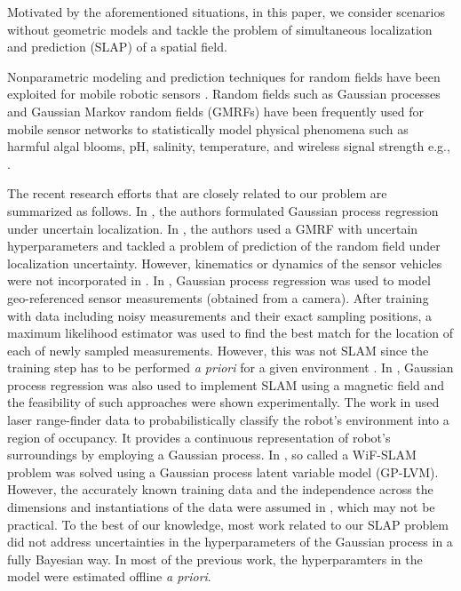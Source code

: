 \documentclass[letterpaper, 10 pt, conference]{ieeeconf}
\begin{document}
Motivated by the aforementioned situations, in this paper, we consider scenarios without geometric models and tackle the problem of simultaneous localization and prediction (SLAP) of a spatial field. %

%
%
% 
 
 
 Nonparametric modeling and prediction techniques for random fields have been exploited for mobile robotic sensors \cite{lynch:2008, leonard:2007,choi:2009,cortes:2009,Xu2011sequential}. Random fields such as Gaussian processes and Gaussian Markov random fields (GMRFs)  \cite{cressie:1986,rasmussen:2006} have been frequently used for mobile sensor networks to statistically model physical phenomena such as harmful algal blooms, pH, salinity, temperature, and wireless signal strength e.g., \cite{krause:2008,xu:2011b,graham:2009}.

 {
 The recent research efforts that are closely related to our problem are summarized as follows.
In \cite{jad2012gaussian}, the authors  formulated Gaussian process regression under uncertain localization. In \cite{jadaliha2012efficient},  the authors used a GMRF with uncertain hyperparameters and  tackled a problem of prediction of the random field  under  localization uncertainty.
However, kinematics or dynamics of the sensor vehicles were not incorporated in \cite{jad2012gaussian,jadaliha2012efficient}.}
 In \cite{brooks2008gaussian},  Gaussian process regression was used to model geo-referenced sensor measurements (obtained from a camera). After training with  data including noisy measurements and their exact sampling positions, a maximum likelihood estimator was used to find the best match for  the  location of  each of newly sampled measurements. However, this was not SLAM since the training step has to be performed {\em a priori} for a given environment \cite{brooks2008gaussian}.
In \cite{kemppainen2010near,vallivaara2010simultaneous},  Gaussian process regression was also used to implement SLAM using a magnetic field and the  feasibility of such approaches were shown 
experimentally.
The work in \cite{o2009contextual}  used laser range-finder data to probabilistically classify the
 robot's environment into a region of occupancy. It  provides a continuous representation of robot's surroundings by employing a Gaussian process.
In \cite{ferris2007wifi},  so called a WiF-SLAM problem was solved using a Gaussian process latent variable model (GP-LVM). 
However, the accurately known training data and the independence across the dimensions and instantiations of the data were assumed in \cite{ferris2007wifi}, which may  not be practical.
To the best of our knowledge, most work related to our SLAP problem did not address uncertainties in the hyperparameters of the Gaussian process in a fully Bayesian way. In most of the previous work, the hyperparamters in the model were estimated offline {\em a priori}.
\end{document}
